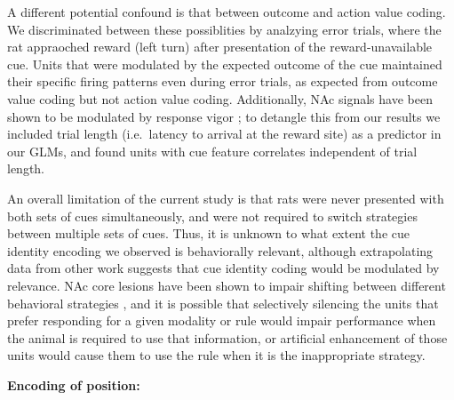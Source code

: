 \documentclass[11pt]{article}
\let\cite=\citep
\begin{document}
A different potential confound is that between outcome and action
value coding. We discriminated between these possiblities by analzying
error trials, where the rat appraoched reward (left turn) after
presentation of the reward-unavailable cue. Units that were modulated
by the expected outcome of the cue maintained their specific firing
patterns even during error trials, as expected from outcome value
coding but not action value coding. Additionally, NAc signals have
been shown to be modulated by response vigor \cite{McGinty2013}; to
detangle this from our results we included trial length (i.e.\ latency
to arrival at the reward site) as a predictor in our GLMs, and found
units with cue feature correlates independent of trial length.

An overall limitation of the current study is that rats were never
presented with both sets of cues simultaneously, and were not required
to switch strategies between multiple sets of cues. Thus, it is
unknown to what extent the cue identity encoding we observed is
behaviorally relevant, although extrapolating data from other work
\cite{Sleezer2016} suggests that cue identity coding would be
modulated by relevance. NAc core lesions have been shown to impair
shifting between different behavioral strategies \cite{Floresco2006a},
and it is possible that selectively silencing the units that prefer
responding for a given modality or rule would impair performance when
the animal is required to use that information, or artificial
enhancement of those units would cause them to use the rule when it is
the inappropriate strategy.

{\bf Encoding of position:}
\end{document}
